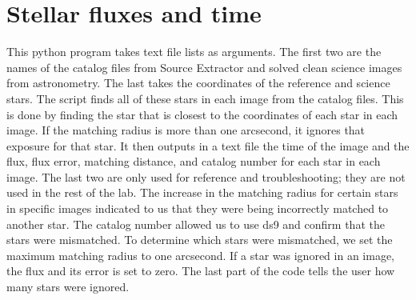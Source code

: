 \documentclass{aastex61}
\begin{document}
\section{Stellar fluxes and time} \label{code: flux}
This python program takes text file lists as arguments. The first two are the names of the catalog files from Source Extractor and solved clean science images from astronometry. The last takes the coordinates of the reference and science stars. The script finds all of these stars in each image from the catalog files. This is done by finding the star that is closest to the coordinates of each star in each image. If the matching radius is more than one arcsecond, it ignores that exposure for that star. It then outputs in a text file the time of the image and the flux, flux error, matching distance, and catalog number for each star in each image. The last two are only used for reference and troubleshooting; they are not used in the rest of the lab. The increase in the matching radius for certain stars in specific images indicated to us that they were being incorrectly matched to another star. The catalog number allowed us to use ds9 and confirm that the stars were mismatched. To determine which stars were mismatched, we set the maximum matching radius to one arcsecond. If a star was ignored in an image, the flux and its error is set to zero. The last part of the code tells the user how many stars were ignored. 
\end{document}
